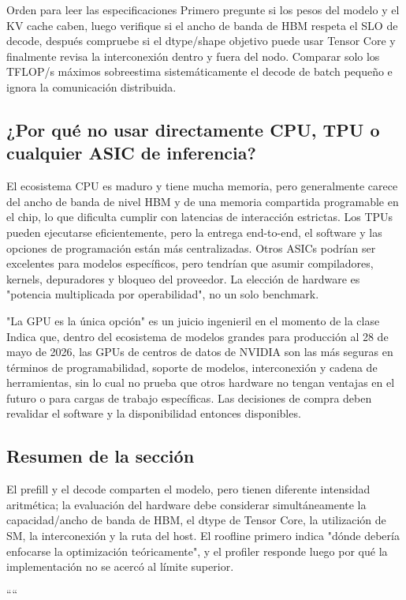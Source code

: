 
\begin{importantbox}{Orden para leer las especificaciones}
Primero pregunte si los pesos del modelo y el KV cache caben, luego verifique si el ancho de banda de HBM respeta el SLO de decode, después compruebe si el dtype/shape objetivo puede usar Tensor Core y finalmente revisa la interconexión dentro y fuera del nodo. Comparar solo los TFLOP/s máximos sobreestima sistemáticamente el decode de batch pequeño e ignora la comunicación distribuida.
\end{importantbox}

\subsection{¿Por qué no usar directamente CPU, TPU o cualquier ASIC de inferencia?}

El ecosistema CPU es maduro y tiene mucha memoria, pero generalmente carece del ancho de banda de nivel HBM y de una memoria compartida programable en el chip, lo que dificulta cumplir con latencias de interacción estrictas. Los TPUs pueden ejecutarse eficientemente, pero la entrega end-to-end, el software y las opciones de programación están más centralizadas. Otros ASICs podrían ser excelentes para modelos específicos, pero tendrían que asumir compiladores, kernels, depuradores y bloqueo del proveedor. La elección de hardware es "potencia multiplicada por operabilidad", no un solo benchmark.


\begin{warningbox}{"La GPU es la única opción" es un juicio ingenieril en el momento de la clase}
Indica que, dentro del ecosistema de modelos grandes para producción al 28 de mayo de 2026, las GPUs de centros de datos de NVIDIA son las más seguras en términos de programabilidad, soporte de modelos, interconexión y cadena de herramientas, sin lo cual no prueba que otros hardware no tengan ventajas en el futuro o para cargas de trabajo específicas. Las decisiones de compra deben revalidar el software y la disponibilidad entonces disponibles.
\end{warningbox}

\subsection{Resumen de la sección}

El prefill y el decode comparten el modelo, pero tienen diferente intensidad aritmética; la evaluación del hardware debe considerar simultáneamente la capacidad/ancho de banda de HBM, el dtype de Tensor Core, la utilización de SM, la interconexión y la ruta del host. El roofline primero indica "dónde debería enfocarse la optimización teóricamente", y el profiler responde luego por qué la implementación no se acercó al límite superior.

````
